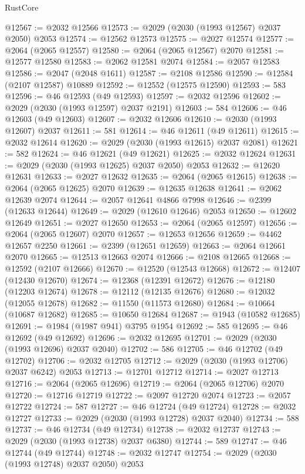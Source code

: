 \begin{lexlean}{RustCore}
\begin{coremodule}
@12567 := @2032 @12566
@12573 := @2029 (@2030 (@1993 @12567) @2037 @2050) @2053
@12574 := @12562 @12573
@12575 := @2027 @12574
@12577 := @2064 (@2065 @12557)
@12580 := @2064 (@2065 @12567) @2070
@12581 := @12577 @12580
@12583 := @2062 @12581 @2074
@12584 := @2057 @12583
@12586 := @2047 (@2048 @1611)
@12587 := @2108 @12586
@12590 := @12584 (@2107 @12587) @10889
@12592 := @12552 (@12575 @12590)
@12593 := 583
@12596 := @46 @12593 (@49 @12593)
@12597 := @2032 @12596
@12602 := @2029 (@2030 (@1993 @12597) @2037 @2191)
@12603 := 584
@12606 := @46 @12603 (@49 @12603)
@12607 := @2032 @12606
@12610 := @2030 (@1993 @12607) @2037
@12611 := 581
@12614 := @46 @12611 (@49 @12611)
@12615 := @2032 @12614
@12620 := @2029 (@2030 (@1993 @12615) @2037 @2081)
@12621 := 582
@12624 := @46 @12621 (@49 @12621)
@12625 := @2032 @12624
@12631 := @2029 (@2030 (@1993 @12625) @2037 @2050) @2053
@12632 := @12620 @12631
@12633 := @2027 @12632
@12635 := @2064 (@2065 @12615)
@12638 := @2064 (@2065 @12625) @2070
@12639 := @12635 @12638
@12641 := @2062 @12639 @2074
@12644 := @2057 @12641 @4866 @7998
@12646 := @2399 (@12633 @12644)
@12649 := @2029 (@12610 @12646) @2053
@12650 := @12602 @12649
@12651 := @2027 @12650
@12653 := @2064 (@2065 @12597)
@12656 := @2064 (@2065 @12607) @2070
@12657 := @12653 @12656
@12659 := @4462 @12657 @2250
@12661 := @2399 (@12651 @12659)
@12663 := @2064 @12661 @2070
@12665 := @12513 @12663 @2074
@12666 := @2108 @12665
@12668 := @12592 (@2107 @12666)
@12670 := @12520 (@12543 @12668)
@12672 := @12407 (@12430 @12670)
@12674 := @12368 (@12391 @12672)
@12676 := @12180 (@12203 @12674)
@12678 := @12112 (@12135 @12676)
@12680 := @12032 (@12055 @12678)
@12682 := @11550 (@11573 @12680)
@12684 := @10664 (@10687 @12682)
@12685 := @10650 @12684
@12687 := @1943 (@10582 @12685)
@12691 := @1984 (@1987 @941) @3795 @1954
@12692 := 585
@12695 := @46 @12692 (@49 @12692)
@12696 := @2032 @12695
@12701 := @2029 (@2030 (@1993 @12696) @2037 @2040)
@12702 := 586
@12705 := @46 @12702 (@49 @12702)
@12706 := @2032 @12705
@12712 := @2029 (@2030 (@1993 @12706) @2037 @6242) @2053
@12713 := @12701 @12712
@12714 := @2027 @12713
@12716 := @2064 (@2065 @12696)
@12719 := @2064 (@2065 @12706) @2070
@12720 := @12716 @12719
@12722 := @2097 @12720 @2074
@12723 := @2057 @12722
@12724 := 587
@12727 := @46 @12724 (@49 @12724)
@12728 := @2032 @12727
@12733 := @2029 (@2030 (@1993 @12728) @2037 @2040)
@12734 := 588
@12737 := @46 @12734 (@49 @12734)
@12738 := @2032 @12737
@12743 := @2029 (@2030 (@1993 @12738) @2037 @6380)
@12744 := 589
@12747 := @46 @12744 (@49 @12744)
@12748 := @2032 @12747
@12754 := @2029 (@2030 (@1993 @12748) @2037 @2050) @2053

\end{coremodule}
\end{lexlean}

